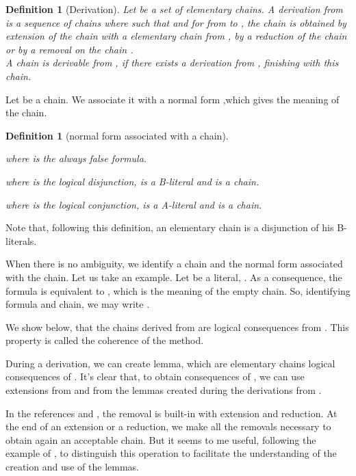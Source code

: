 \documentclass{article}
\newtheorem{definition}[theoreme]{Definition}
\begin{document}
\begin{definition}[Derivation]\label{derivation1}
Let  be a set of elementary chains. A derivation from  is a sequence of chains  where 
such that  and for  from  to , the chain  is obtained by extension of the chain  with
a elementary chain from , by a reduction of the chain  or by a removal on the chain .\\
A chain is derivable from , if there exists a derivation from , finishing with this chain.
\end{definition}

Let  be a chain. We associate it with a normal form ,which gives the meaning of the chain. 

\begin{definition}[normal form associated with a chain]\ 
\begin{itemrond}
\item  where  is the always false formula.
\item  where  is the logical disjunction,  is a B-literal and  is a chain.
\item  where  is the logical conjunction,  is a A-literal and  is a chain.
\end{itemrond}
\end{definition}

Note that, following this definition, an elementary chain is a disjunction of his B-literals.

When there is no ambiguity, we identify a chain and the normal form associated with the chain. Let us take an example.
Let  be a literal, . As a consequence, the formula  is equivalent to , 
which is the meaning of the empty chain. So, identifying formula and chain, we may write .

We show below, that the chains derived from  are logical consequences from . This property is called the 
coherence of the method.

During a derivation, we can create lemma, which are elementary chains logical consequences of .
It's clear that, to obtain consequences of , we can use extensions from  and from the lemmas created during
the derivations from .

In the references \cite{Loveland1997} and \cite{Loveland1978}, the removal is built-in with extension and reduction.
At the end of an extension or a reduction, we make all the removals necessary to obtain again an acceptable chain. 
But it seems to me useful, following the example of \cite{CSC648}, to distinguish this operation to facilitate the 
understanding of the creation and use of the lemmas.
\end{document}

